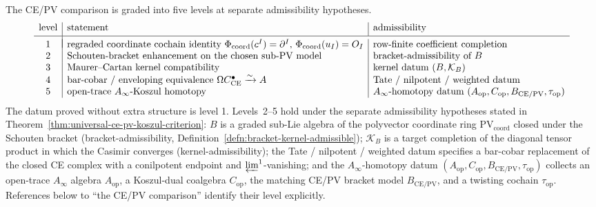 \documentclass[11pt]{memoir}
\begin{document}
The CE/PV comparison is graded into five levels at separate
admissibility hypotheses.
\[
  \begin{array}{c|l|l}
    \text{level} & \text{statement} & \text{admissibility} \\[2pt]
    \hline\\[-9pt]
    1 & \text{regraded coordinate cochain identity }
        \Phi_{\mathrm{coord}}(c^I)=\partial^I,\,
        \Phi_{\mathrm{coord}}(u_I)=O_I
      & \text{row-finite coefficient completion} \\
    2 & \text{Schouten-bracket enhancement on the chosen sub-PV model}
      & \text{bracket-admissibility of } B \\
    3 & \text{Maurer--Cartan kernel compatibility}
      & \text{kernel datum }(B,\mathcal K_B) \\
    4 & \text{bar-cobar / enveloping equivalence }
        \Omega C^\bullet_{\mathrm{CE}}\xrightarrow{\sim}A
      & \text{Tate / nilpotent / weighted datum} \\
    5 & \text{open-trace }A_\infty\text{-Koszul homotopy}
      & A_\infty\text{-homotopy datum }
        (A_{\mathrm{op}},C_{\mathrm{op}},B_{\mathrm{CE/PV}},\tau_{\mathrm{op}})
  \end{array}
\]
The datum proved without extra structure is level 1.  Levels~2--5 hold
under the separate admissibility hypotheses stated in
Theorem~\ref{thm:universal-ce-pv-koszul-criterion}: \(B\) is a graded
sub-Lie algebra of the polyvector coordinate ring
\(\mathrm{PV}_{\mathrm{coord}}\) closed under the Schouten bracket
(bracket-admissibility,
Definition~\ref{defn:bracket-kernel-admissible}); \(\mathcal K_B\) is a
target completion of the diagonal tensor product in which the Casimir
converges (kernel-admissibility); the Tate / nilpotent / weighted datum
specifies a bar-cobar replacement of the closed CE complex with a
conilpotent endpoint and \(\varprojlim^1\)-vanishing; and the
\(A_\infty\)-homotopy datum
\((A_{\mathrm{op}},C_{\mathrm{op}},B_{\mathrm{CE/PV}},\tau_{\mathrm{op}})\)
collects an open-trace \(A_\infty\) algebra
\(A_{\mathrm{op}}\), a Koszul-dual coalgebra \(C_{\mathrm{op}}\), the
matching CE/PV bracket model \(B_{\mathrm{CE/PV}}\), and a twisting
cochain \(\tau_{\mathrm{op}}\).  References below to ``the CE/PV
comparison'' identify their level explicitly.
\end{document}
